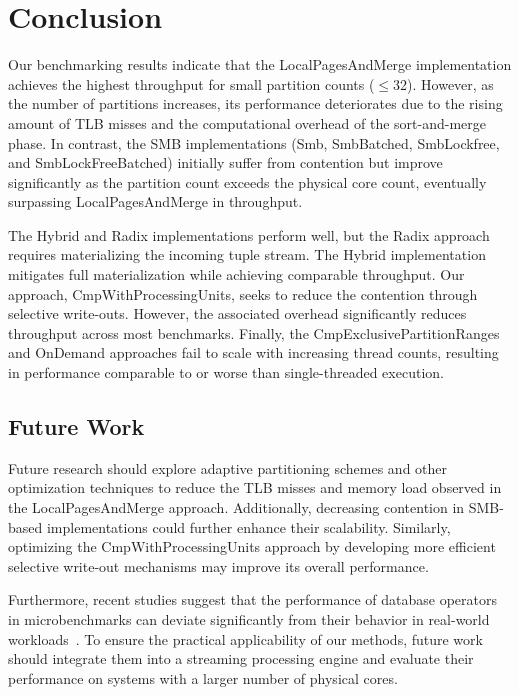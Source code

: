 
\chapter{Conclusion}\label{chapter:conclusion}\acresetall
Our benchmarking results indicate that the LocalPagesAndMerge implementation achieves the highest throughput for small partition counts ($\le$32).
However, as the number of partitions increases, its performance deteriorates due to the rising amount of \ac{TLB} misses and the computational overhead of the sort-and-merge phase.
In contrast, the \ac{SMB} implementations (Smb, SmbBatched, SmbLockfree, and SmbLockFreeBatched) initially suffer from contention but improve significantly as the partition count exceeds the physical core count, eventually surpassing LocalPagesAndMerge in throughput.

The Hybrid and Radix implementations perform well, but the Radix approach requires materializing the incoming tuple stream.
The Hybrid implementation mitigates full materialization while achieving comparable throughput.
Our approach, CmpWithProcessingUnits, seeks to reduce the contention through selective write-outs.
However, the associated overhead significantly reduces throughput across most benchmarks.
Finally, the CmpExclusivePartitionRanges and OnDemand approaches fail to scale with increasing thread counts, resulting in performance comparable to or worse than single-threaded execution.
\section{Future Work}
Future research should explore adaptive partitioning schemes and other optimization techniques to reduce the \ac{TLB} misses and memory load observed in the LocalPagesAndMerge approach.
Additionally, decreasing contention in SMB-based implementations could further enhance their scalability.
Similarly, optimizing the CmpWithProcessingUnits approach by developing more efficient selective write-out mechanisms may improve its overall performance.

Furthermore, recent studies suggest that the performance of database operators in microbenchmarks can deviate significantly from their behavior in real-world workloads~\parencite{joins-real-system}.
To ensure the practical applicability of our methods, future work should integrate them into a streaming processing engine and evaluate their performance on systems with a larger number of physical cores.
